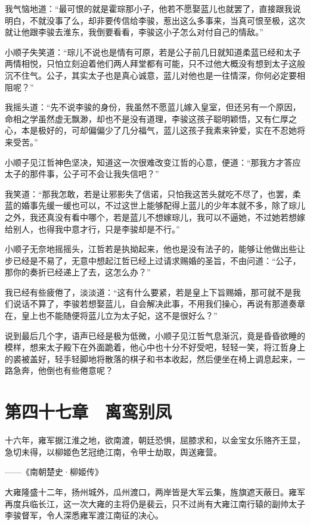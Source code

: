 我气恼地道：“最可恨的就是霍琮那小子，他若不愿娶蓝儿也就罢了，直接跟我说明白，不就没事了么，却非要传信给李骏，惹出这么多事来，当真可恨至极，这次就让他跟李骏去淮东，我倒要看看，李骏这小子怎么对付自己的情敌。”

小顺子失笑道：“琮儿不说也是情有可原，若是公子前几日就知道柔蓝已经和太子两情相悦，只怕立刻迫着他们两人拜堂都有可能，只不过他大概没有想到太子这般沉不住气。公子，其实太子也是真心诚意，蓝儿对他也是一往情深，你何必定要相阻呢？”

我摇头道：“先不说李骏的身份，我虽然不愿蓝儿嫁入皇室，但还另有一个原因，命相之学虽然虚无飘渺，却也不是没有道理，李骏这孩子聪明颖悟，又有仁厚之心，本是极好的，可却偏偏少了几分福气，蓝儿这孩子我素来钟爱，实在不忍她将来受苦。”

小顺子见江哲神色坚决，知道这一次很难改变江哲的心意，便道：“那我方才答应太子的那件事，公子可不会让我失信吧？”

我笑道：“那我怎敢，若是让邪影失了信诺，只怕我这苦头就吃不尽了，也罢，柔蓝的婚事先缓一缓也可以，不过这世上能够配得上蓝儿的少年本就不多，除了琮儿之外，我还真没有看中哪个，若是蓝儿不想嫁琮儿，我可以不逼她，不过她若想嫁给别人，也得我中意才行，只是李骏却是不行。”

小顺子无奈地摇摇头，江哲若是执拗起来，他也是没有法子的，能够让他做出些让步已经是不易了，无意中想起江哲已经上过请求赐婚的圣旨，不由问道：“公子，那你的奏折已经递上了去，这怎么办？”

我已经有些疲倦了，淡淡道：“这有什么要紧，若是皇上下旨赐婚，那可就不是我们说话不算了，李骏若想娶蓝儿，自会解决此事，不用我们操心，再说有那道奏章在，皇上也不能随便将蓝儿立为太子妃，这不是很好么？”

说到最后几个字，语声已经是极为低微，小顺子见江哲气息渐沉，竟是昏昏欲睡的模样，想来太子殿下在外面跪着，他心中也十分不好受吧，轻轻一笑，将江哲身上的裘被盖好，轻手轻脚地将散落的棋子和书本收起，然后便坐在椅上调息起来，一路急奔，他倒也有些倦意呢？

\chapter{第四十七章　离鸾别凤}

十六年，雍军据江淮之地，欲南渡，朝廷恐惧，屈膝求和，以金宝女乐赂齐王显，急切未得，以柳姬色艺冠绝江南，令甲士劫取，舆送雍营。

——《南朝楚史·柳姬传》

大雍隆盛十二年，扬州城外，瓜州渡口，两岸皆是大军云集，旌旗遮天蔽日。雍军再度兵临长江，这一次大雍的主将仍是裴云，只不过尚有大雍江南行辕的副帅太子李骏督军，令人深悉雍军渡江南征的决心。

